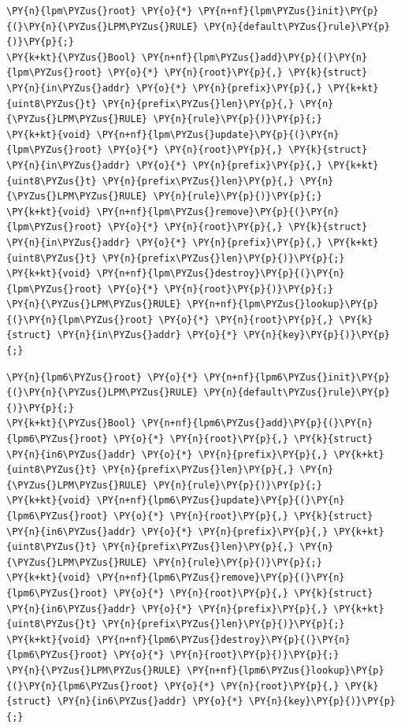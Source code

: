 \begin{Verbatim}[commandchars=\\\{\}]
\PY{n}{lpm\PYZus{}root} \PY{o}{*} \PY{n+nf}{lpm\PYZus{}init}\PY{p}{(}\PY{n}{\PYZus{}LPM\PYZus{}RULE} \PY{n}{default\PYZus{}rule}\PY{p}{)}\PY{p}{;}
\PY{k+kt}{\PYZus{}Bool} \PY{n+nf}{lpm\PYZus{}add}\PY{p}{(}\PY{n}{lpm\PYZus{}root} \PY{o}{*} \PY{n}{root}\PY{p}{,} \PY{k}{struct} \PY{n}{in\PYZus{}addr} \PY{o}{*} \PY{n}{prefix}\PY{p}{,} \PY{k+kt}{uint8\PYZus{}t} \PY{n}{prefix\PYZus{}len}\PY{p}{,} \PY{n}{\PYZus{}LPM\PYZus{}RULE} \PY{n}{rule}\PY{p}{)}\PY{p}{;}
\PY{k+kt}{void} \PY{n+nf}{lpm\PYZus{}update}\PY{p}{(}\PY{n}{lpm\PYZus{}root} \PY{o}{*} \PY{n}{root}\PY{p}{,} \PY{k}{struct} \PY{n}{in\PYZus{}addr} \PY{o}{*} \PY{n}{prefix}\PY{p}{,} \PY{k+kt}{uint8\PYZus{}t} \PY{n}{prefix\PYZus{}len}\PY{p}{,} \PY{n}{\PYZus{}LPM\PYZus{}RULE} \PY{n}{rule}\PY{p}{)}\PY{p}{;}
\PY{k+kt}{void} \PY{n+nf}{lpm\PYZus{}remove}\PY{p}{(}\PY{n}{lpm\PYZus{}root} \PY{o}{*} \PY{n}{root}\PY{p}{,} \PY{k}{struct} \PY{n}{in\PYZus{}addr} \PY{o}{*} \PY{n}{prefix}\PY{p}{,} \PY{k+kt}{uint8\PYZus{}t} \PY{n}{prefix\PYZus{}len}\PY{p}{)}\PY{p}{;}
\PY{k+kt}{void} \PY{n+nf}{lpm\PYZus{}destroy}\PY{p}{(}\PY{n}{lpm\PYZus{}root} \PY{o}{*} \PY{n}{root}\PY{p}{)}\PY{p}{;}
\PY{n}{\PYZus{}LPM\PYZus{}RULE} \PY{n+nf}{lpm\PYZus{}lookup}\PY{p}{(}\PY{n}{lpm\PYZus{}root} \PY{o}{*} \PY{n}{root}\PY{p}{,} \PY{k}{struct} \PY{n}{in\PYZus{}addr} \PY{o}{*} \PY{n}{key}\PY{p}{)}\PY{p}{;}
\end{Verbatim}

\begin{Verbatim}[commandchars=\\\{\}]
\PY{n}{lpm6\PYZus{}root} \PY{o}{*} \PY{n+nf}{lpm6\PYZus{}init}\PY{p}{(}\PY{n}{\PYZus{}LPM\PYZus{}RULE} \PY{n}{default\PYZus{}rule}\PY{p}{)}\PY{p}{;}
\PY{k+kt}{\PYZus{}Bool} \PY{n+nf}{lpm6\PYZus{}add}\PY{p}{(}\PY{n}{lpm6\PYZus{}root} \PY{o}{*} \PY{n}{root}\PY{p}{,} \PY{k}{struct} \PY{n}{in6\PYZus{}addr} \PY{o}{*} \PY{n}{prefix}\PY{p}{,} \PY{k+kt}{uint8\PYZus{}t} \PY{n}{prefix\PYZus{}len}\PY{p}{,} \PY{n}{\PYZus{}LPM\PYZus{}RULE} \PY{n}{rule}\PY{p}{)}\PY{p}{;}
\PY{k+kt}{void} \PY{n+nf}{lpm6\PYZus{}update}\PY{p}{(}\PY{n}{lpm6\PYZus{}root} \PY{o}{*} \PY{n}{root}\PY{p}{,} \PY{k}{struct} \PY{n}{in6\PYZus{}addr} \PY{o}{*} \PY{n}{prefix}\PY{p}{,} \PY{k+kt}{uint8\PYZus{}t} \PY{n}{prefix\PYZus{}len}\PY{p}{,} \PY{n}{\PYZus{}LPM\PYZus{}RULE} \PY{n}{rule}\PY{p}{)}\PY{p}{;}
\PY{k+kt}{void} \PY{n+nf}{lpm6\PYZus{}remove}\PY{p}{(}\PY{n}{lpm6\PYZus{}root} \PY{o}{*} \PY{n}{root}\PY{p}{,} \PY{k}{struct} \PY{n}{in6\PYZus{}addr} \PY{o}{*} \PY{n}{prefix}\PY{p}{,} \PY{k+kt}{uint8\PYZus{}t} \PY{n}{prefix\PYZus{}len}\PY{p}{)}\PY{p}{;}
\PY{k+kt}{void} \PY{n+nf}{lpm6\PYZus{}destroy}\PY{p}{(}\PY{n}{lpm6\PYZus{}root} \PY{o}{*} \PY{n}{root}\PY{p}{)}\PY{p}{;}
\PY{n}{\PYZus{}LPM\PYZus{}RULE} \PY{n+nf}{lpm6\PYZus{}lookup}\PY{p}{(}\PY{n}{lpm6\PYZus{}root} \PY{o}{*} \PY{n}{root}\PY{p}{,} \PY{k}{struct} \PY{n}{in6\PYZus{}addr} \PY{o}{*} \PY{n}{key}\PY{p}{)}\PY{p}{;}
\end{Verbatim}

